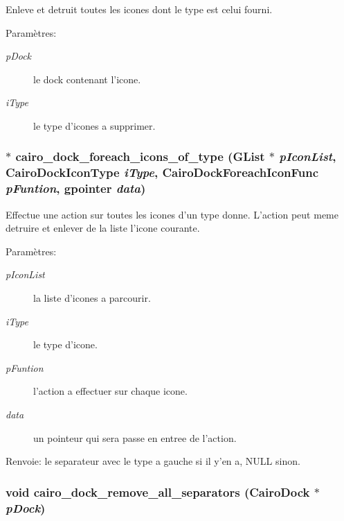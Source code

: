 Enleve et detruit toutes les icones dont le type est celui fourni. \begin{Desc}
\item[Paramètres:]
\begin{description}
\item[{\em pDock}]le dock contenant l'icone. \item[{\em iType}]le type d'icones a supprimer. \end{description}
\end{Desc}
\subsubsection{$\ast$ cairo\_\-dock\_\-foreach\_\-icons\_\-of\_\-type (GList $\ast$ {\em pIconList}, {\bf CairoDockIconType} {\em iType}, {\bf CairoDockForeachIconFunc} {\em pFuntion}, gpointer {\em data})}\label{cairo-dock-icons_8h_47cf0eb7c65345840ac1e3765427fb5d}


Effectue une action sur toutes les icones d'un type donne. L'action peut meme detruire et enlever de la liste l'icone courante. \begin{Desc}
\item[Paramètres:]
\begin{description}
\item[{\em pIconList}]la liste d'icones a parcourir. \item[{\em iType}]le type d'icone. \item[{\em pFuntion}]l'action a effectuer sur chaque icone. \item[{\em data}]un pointeur qui sera passe en entree de l'action. \end{description}
\end{Desc}
\begin{Desc}
\item[Renvoie:]le separateur avec le type a gauche si il y'en a, NULL sinon. \end{Desc}
\subsubsection{\setlength{\rightskip}{0pt plus 5cm}void cairo\_\-dock\_\-remove\_\-all\_\-separators ({\bf CairoDock} $\ast$ {\em pDock})}\label{cairo-dock-icons_8h_f2b6ce6d65ba32099af9d5321f751d3f}


